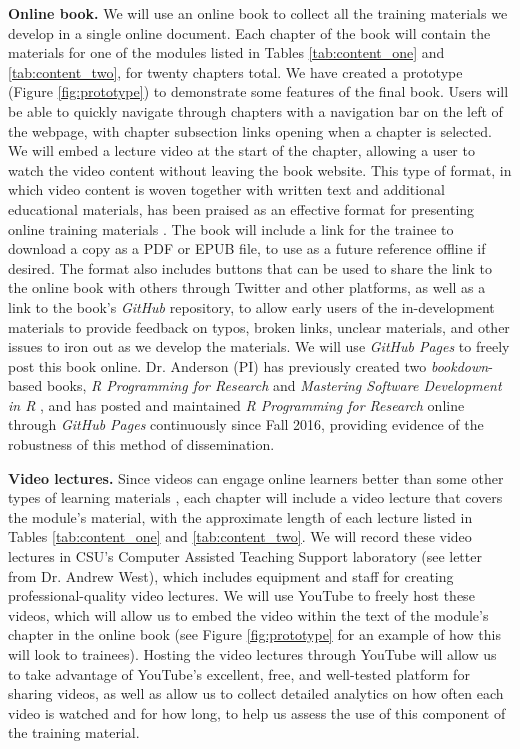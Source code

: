 \documentclass[pdftex,english,11pt,parskip=half]{scrartcl}
\begin{document}
\textbf{Online book.} We will use an online book to collect all the training
materials we develop in a single online document. Each chapter of the book will contain the
materials for one of the modules listed in Tables \ref{tab:content_one} and
\ref{tab:content_two}, for twenty chapters total. We have created a prototype
(Figure \ref{fig:prototype}) to demonstrate some features of the final book.
Users will be able to quickly navigate through chapters with a navigation bar on
the left of the webpage, with chapter subsection links opening when a chapter is
selected. We will embed a lecture video at the start of the chapter, allowing
a user to watch the video content without leaving the book website. This type of format, 
in which video content is woven together with written text and additional educational materials, has been
praised as an effective format for presenting online training materials \cite{searls2012online}.
The book will
include a link for the trainee to download a copy as a PDF or EPUB file, to use
as a future reference offline if desired. The format also includes buttons that
can be used to share the link to the online book with others through Twitter and
other platforms, as well as a link to the book's \textit{GitHub} repository, to allow
early users of the in-development materials to provide feedback on typos, broken
links, unclear materials, and other issues to iron out as we develop the
materials. 
We will use \textit{GitHub Pages} to
freely post this book online. Dr. Anderson (PI) has previously created two
\textit{bookdown}-based books, \textit{R Programming for Research} \cite{andersoncoursebook} and
\textit{Mastering Software Development in R} \cite{andersonmastering}, and has posted and maintained
\textit{R Programming for Research} online through \textit{GitHub Pages} continuously since Fall 2016, providing evidence of the robustness of this method of dissemination.  

\textbf{Video lectures.} 
Since videos can engage online learners better than some other types of learning materials \cite{searls2012ten}, each chapter will include a video lecture that covers
the module's material, with the approximate length of each lecture listed in
Tables \ref{tab:content_one} and \ref{tab:content_two}. We will record these
video lectures in CSU's Computer Assisted Teaching Support laboratory (see
letter from Dr. Andrew West), which includes equipment and staff for creating
professional-quality video lectures. We will use YouTube to freely host these
videos, which will allow us to embed the video within the text of the module's chapter in the
online book (see Figure \ref{fig:prototype} for an example of how this will look
to trainees). Hosting the video lectures through YouTube will allow
us to take advantage of YouTube's excellent, free, and well-tested platform for
sharing videos, as well as allow us to collect detailed analytics on how often
each video is watched and for how long, to help us assess the use of this
component of the training material. 
\end{document}
